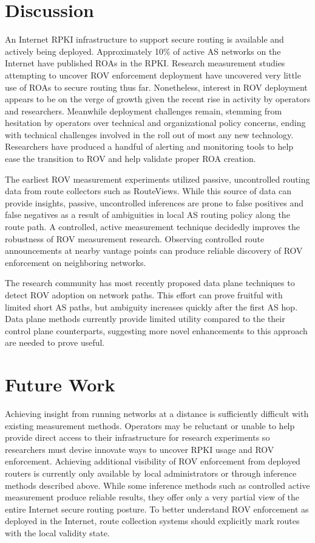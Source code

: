 \documentclass[sigconf]{acmart}
\begin{document}
\section{Discussion}\label{sec:Discussion}

An Internet RPKI infrastructure to support secure routing is available
and actively being deployed.  Approximately 10\% of active AS networks
on the Internet have published ROAs in the RPKI.   Research measurement
studies attempting to uncover ROV enforcement deployment have uncovered
very little use of ROAs to secure routing thus far.  Nonetheless,
interest in ROV deployment appears to be on the verge of growth given
the recent rise in activity by operators and researchers.  Meanwhile
deployment challenges remain, stemming from hesitation by operators over
technical and organizational policy concerns, ending with technical
challenges involved in the roll out of most any new technology.
Researchers have produced a handful of alerting and monitoring tools to
help ease the transition to ROV and help validate proper ROA creation.

The earliest ROV measurement experiments utilized passive, uncontrolled
routing data from route collectors such as RouteViews.  While this
source of data can provide insights, passive, uncontrolled inferences
are prone to false positives and false negatives as a result of
ambiguities in local AS routing policy along the route path.  A
controlled, active measurement technique decidedly improves the
robustness of ROV measurement research.  Observing controlled route
announcements at nearby vantage points can produce reliable discovery of
ROV enforcement on neighboring networks.

The research community has most recently proposed data plane techniques
to detect ROV adoption on network paths.  This effort can prove fruitful
with limited short AS paths, but ambiguity increases quickly after the
first AS hop.  Data plane methods currently provide limited utility
compared to the their control plane counterparts, suggesting more novel
enhancements to this approach are needed to prove useful.

\section{Future Work}\label{sec:Future Work}

Achieving insight from running networks at a distance is sufficiently
difficult with existing measurement methods.  Operators may be reluctant
or unable to help provide direct access to their infrastructure for
research experiments so researchers must devise innovate ways to uncover
RPKI usage and ROV enforcement.  Achieving additional visibility of ROV
enforcement from deployed routers is currently only available by local
administrators or through inference methods described above.  While some
inference methods such as controlled active measurement produce reliable
results, they offer only a very partial view of the entire Internet
secure routing posture.  To better understand ROV enforcement as
deployed in the Internet, route collection systems should explicitly
mark routes with the local validity state.
\end{document}
